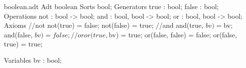 \begin{filecontents*}{boolean.adt}
Adt boolean
	Sorts bool;
	Generators
		true : bool;
		false : bool;
	Operations 
		not : bool -> bool;
		and : bool, bool -> bool;
		or : bool, bool -> bool;
	Axioms
		//not
		not(true) = false;
		not(false) = true;	
		//and
		and(true, $bv) = $bv;
		and(false, $bv) = false;
		//or
		or(true, $bv) = true;
		or(false, false) = false;
		or(false, true) = true;
		
	Variables
		bv : bool;
\end{filecontents*}